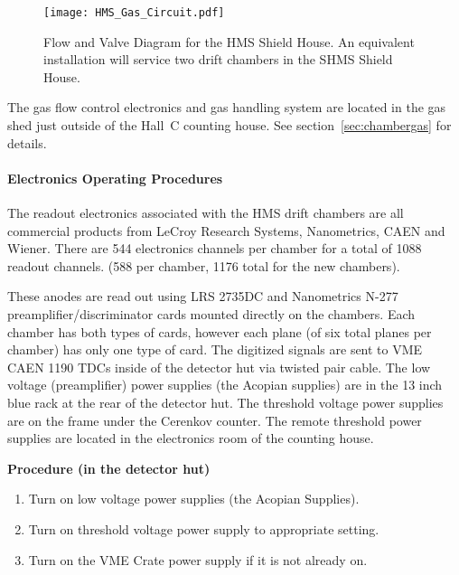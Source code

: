 {\begin{figure}
\begin{center}
\texttt{[image: HMS\_Gas\_Circuit.pdf]}
\caption{Flow and Valve Diagram for the HMS Shield House. An equivalent
installation will service two drift chambers in the SHMS Shield House.}
\label{fig:HMS_flow}
\end{center}
\end{figure}

The gas flow control electronics
and gas handling system are located in the gas shed just outside
of the Hall~C counting house.  See section~\ref{sec:chambergas} for details.

\paragraph{Electronics Operating Procedures}

The readout electronics associated with the HMS drift chambers are all
commercial products from LeCroy Research Systems, Nanometrics, CAEN
and Wiener.  There are 544 electronics channels per chamber for
a total of 1088 readout channels.  (588 per chamber, 1176 total
for the new chambers).

These anodes are read out using LRS 2735DC
and Nanometrics N-277 preamplifier/discriminator cards mounted directly
on the chambers.  Each chamber has both types of cards, however each plane
(of six total planes per chamber) has only one type of card.  The
digitized signals are sent to VME CAEN 1190 TDCs inside of the detector hut
via twisted pair cable.  The low voltage (preamplifier) power supplies
(the Acopian supplies)
are in the 13 inch blue rack at the rear of the detector hut.  The
threshold voltage power supplies are on the frame under the Cerenkov
counter.  The remote
threshold power supplies are located in the electronics room of the counting
house.

\begin{center}
{\bf Procedure (in the detector hut)}
\end{center}

\begin{enumerate}
\item {Turn on low voltage power supplies (the Acopian Supplies).}
\item {Turn on threshold voltage power supply to appropriate setting.}
\item {Turn on the VME Crate power supply if it is not already on.}
\end{enumerate}

}

